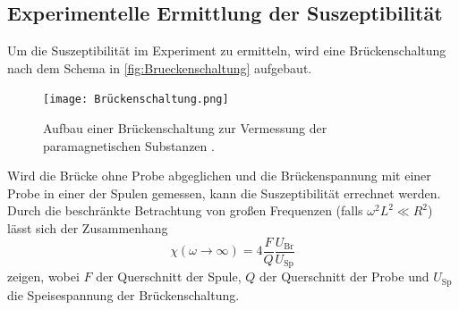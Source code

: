 \subsection{Experimentelle Ermittlung der Suszeptibilität}
Um die Suszeptibilität im Experiment zu ermitteln, wird eine Brückenschaltung nach dem Schema in \autoref{fig:Brueckenschaltung} aufgebaut.
\begin{figure}
    \centering
    \texttt{[image: Brückenschaltung.png]}
    \caption{Aufbau einer Brückenschaltung zur Vermessung der paramagnetischen Substanzen \cite{anleitung}.}
    \label{fig:Brueckenschaltung}
\end{figure}
Wird die Brücke ohne Probe abgeglichen und die Brückenspannung mit einer Probe in einer der Spulen gemessen, kann die Suszeptibilität errechnet werden.
Durch die beschränkte Betrachtung von großen Frequenzen (falls $\omega^2L^2 \ll R^2$) lässt sich der Zusammenhang
\begin{equation}
    \chi(\omega\to\infty) = 4 \frac{F}{Q}\frac{U_{\text{Br}}}{U_{\text{Sp}}}
\end{equation}
zeigen, wobei $F$ der Querschnitt der Spule, $Q$ der Querschnitt der Probe und $U_{\text{Sp}}$ die Speisespannung der Brückenschaltung.\\
\\

